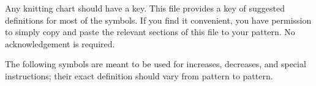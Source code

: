 \documentclass{article}
\newif \ifdesigner
\begin{document}
\begin{fullpages}

\ifdesigner
Any knitting chart should have a key. This file provides a key of
suggested definitions for most of the symbols. If you find it
convenient, you have permission to simply copy and paste the relevant
sections of this file to your pattern. No acknowledgement is required.

The following symbols are meant to be used for increases, decreases,
and special instructions; their
exact definition should vary from pattern to pattern.

\begin{quote}
\quad
\textknit{!}
\quad
\textknit{*}
\end{quote}



\end{fullpages}
\end{document}
